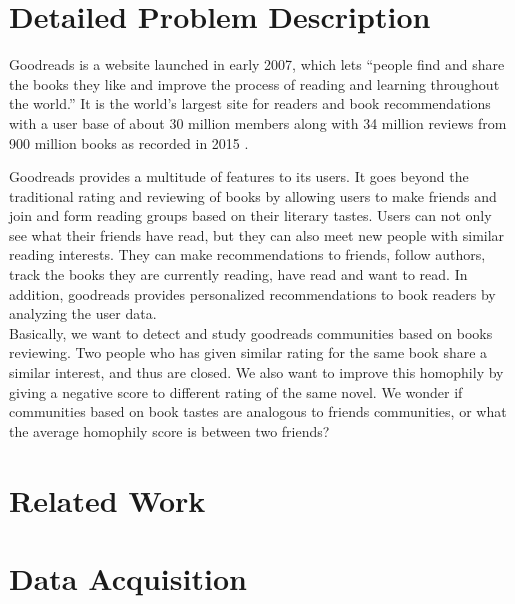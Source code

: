 \documentclass[11pt]{article}
\begin{document}


\section{Detailed Problem Description}
Goodreads is a website launched in early 2007, which lets ``people find and share the books they like and improve the process of reading and learning throughout the world.'' It is the world's largest site for readers and book recommendations with a user base of about 30 million members along with 34 million reviews from 900 million books as recorded in 2015 \cite{goodreads:aboutus}.

Goodreads provides a multitude of features to its users. It goes beyond the traditional rating and reviewing of books by allowing users to make friends and join and form reading groups based on their literary tastes.
Users can not only see what their friends have read, but they can also meet new people with similar reading interests. They can make recommendations to friends, follow authors, track the books they are currently reading, have read and want to read. In addition, goodreads provides personalized recommendations to book readers by analyzing the user data.\\

Basically, we want to detect and study goodreads communities based on books reviewing. Two people who has given similar rating for the same book share a similar interest, and thus are closed. We also want to improve this homophily by giving a negative score to different rating of the same novel.
We wonder if communities based on book tastes are analogous to friends communities, or what the average homophily score is between two friends?


\section{Related Work}


\section{Data Acquisition}
\end{document}
